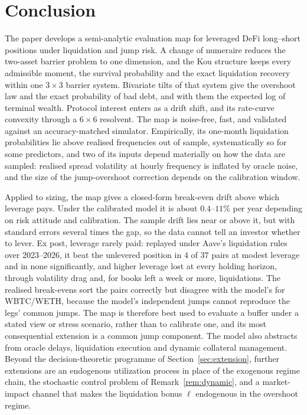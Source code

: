 \documentclass[11pt]{article}
\theoremstyle{plain}
\theoremstyle{definition}
\theoremstyle{remark}
\begin{document}
\section{Conclusion}\label{sec:conclusion}

The paper develops a semi-analytic evaluation map for leveraged DeFi long--short positions under
liquidation and jump risk. A change of numeraire reduces the two-asset barrier problem to one
dimension, and the Kou structure keeps every admissible moment, the survival probability and the
exact liquidation recovery within one $3\times3$ barrier system. Bivariate tilts of that system give
the overshoot law and the exact probability of bad debt, and with them the expected log of terminal
wealth. Protocol interest enters as a drift shift, and its rate-curve convexity through a $6\times6$
resolvent. The map is noise-free, fast, and validated against an accuracy-matched simulator.
Empirically, its one-month liquidation probabilities lie above realised frequencies out of sample,
systematically so for some predictors, and two of its
inputs depend materially on how the data are sampled: realised spread volatility at hourly frequency
is inflated by oracle noise, and the size of the jump-overshoot correction depends on the calibration
window.

Applied to sizing, the map gives a closed-form break-even drift above which leverage pays. Under
the calibrated model it is about $0.4$--$11\%$ per year depending on risk attitude and calibration.
The sample drift lies near or above it, but with standard errors several times the gap, so the data
cannot tell an investor whether to lever. Ex post, leverage rarely paid: replayed under Aave's
liquidation rules over 2023--2026, it beat the unlevered position in $4$ of $37$ pairs at modest
leverage and in none significantly, and higher leverage lost at every holding horizon, through
volatility drag and, for books left a week or more, liquidations. The realised break-evens sort the pairs correctly but disagree with the model's for
WBTC/WETH, because the model's independent jumps cannot reproduce the legs' common jumps.
The map is therefore best used to evaluate a buffer under a stated view or stress scenario, rather
than to calibrate one, and its most consequential extension is a common jump component. The model
also abstracts from oracle delays, liquidation execution and dynamic collateral management. Beyond
the decision-theoretic programme of Section~\ref{sec:extension}, further extensions are an
endogenous utilization process in place of the exogenous regime chain, the stochastic control
problem of Remark~\ref{rem:dynamic}, and a market-impact channel that makes the liquidation bonus
$\ell$ endogenous in the overshoot regime.
\end{document}
